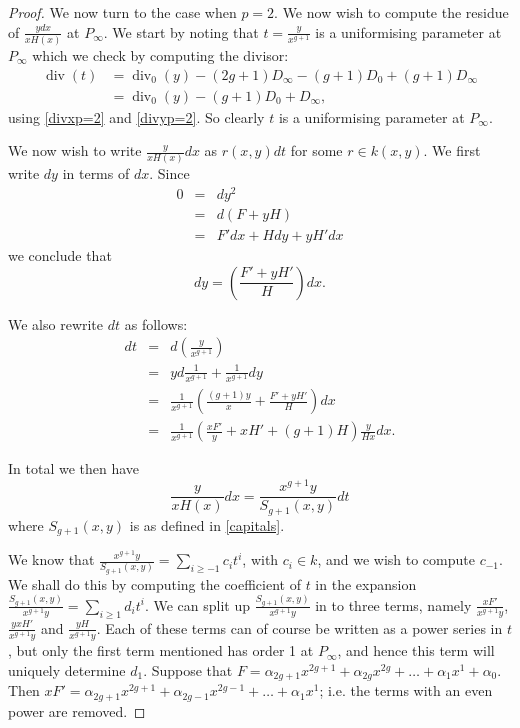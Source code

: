 \documentclass[draft, 11pt]{article} %
\theoremstyle{plain}
\theoremstyle{remark}
\DeclareMathOperator{\di}{div}
\begin{document}
\begin{proof}
We now turn to the case when $p=2$.
We now wish to compute the residue of $\frac{ydx}{xH(x)}$ at $P_\infty$.
We start by noting that $t = \frac{y}{x^{g+1}}$ is a uniformising parameter at $P_\infty$ which we check by computing the divisor:
\begin{align*}
\di(t) & = \di_0(y) - (2g+1)D_\infty -(g+1)D_0 + (g+1)D_\infty \\
& = \di_0(y)-(g+1)D_0 + D_\infty,
\end{align*}
using \eqref{divxp=2} and \eqref{divyp=2}.
So clearly $t$ is a uniformising parameter at $P_\infty$.

We now wish to write $\frac{y}{xH(x)}dx$ as $r(x,y)dt$ for some $r \in k(x,y)$.
We first write $dy$ in terms of $dx$.
Since
\begin{eqnarray*}
0 & = & dy^2 \\
& = & d(F+yH) \\
& = & F'dx + Hdy + yH'dx
\end{eqnarray*}
we conclude that
\[
dy = \left( \frac{F'+yH'}{H} \right) dx.
\]

We also rewrite $dt$ as follows:
\begin{eqnarray*}
dt & = & d\left( \frac{y}{x^{g+1}} \right) \\
& = & yd\frac{1}{x^{g+1}} + \frac{1}{x^{g+1}}dy \\
& = & \frac{1}{x^{g+1}} \left( \frac{(g+1)y}{x} + \frac{F'+yH'}{H} \right) dx \\
& = & \frac{1}{x^{g+1}} \left( \frac{xF'}{y} + xH' + (g+1)H \right) \frac{y}{Hx} dx.
\end{eqnarray*}

In total we then have
\[
\frac{y}{xH(x)}dx = \frac{x^{g+1}y}{S_{g+1}(x,y)}dt
\]
where $S_{g+1}(x,y)$ is as defined in \eqref{capitals}.

We know that $\frac{x^{g+1}y}{S_{g+1}(x,y)} = \sum_{i\geq -1} c_i t^i$, with $c_i \in k$, and we wish to compute $c_{-1}$.
We shall do this by computing the coefficient of $t$ in the expansion $\frac{S_{g+1}(x,y)}{x^{g+1}y} = \sum_{i\geq 1}d_it^i$.
We can split up $\frac{S_{g+1}(x,y)}{x^{g+1}y}$ in to three terms, namely $\frac{xF'}{x^{g+1}y}$, $\frac{yxH'}{x^{g+1}y}$ and $\frac{yH}{x^{g+1}y}$.
Each of these terms can of course be written as a power series in $t$, but only the first term mentioned has order 1 at $P_\infty$, and hence this term will uniquely determine $d_1$.
Suppose that $F = \alpha_{2g+1}x^{2g+1} + \alpha_{2g}x^{2g} + \ldots + \alpha_1x^1 + \alpha_0$.
Then $xF'= \alpha_{2g+1}x^{2g+1} + \alpha_{2g-1}x^{2g-1} + \ldots + \alpha_1x^1$; i.e. the terms with an even power are removed.


\end{proof}
\end{document}
